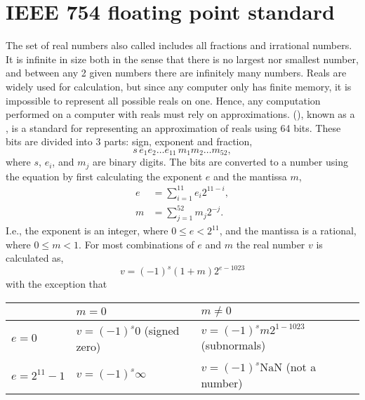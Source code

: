 \section{IEEE 754 floating point standard}
\label{sec:floatingPoint}
The set of real numbers also called  includes all fractions and irrational numbers. It is infinite in size both in the sense that there is no largest nor smallest number, and between any 2 given numbers there are infinitely many numbers. Reals are widely used for calculation, but since any computer only has finite memory, it is impossible to represent all possible reals on one. Hence, any computation performed on a computer with reals must rely on approximations.  (), known as a , is a standard for representing an approximation of reals using 64 bits. These bits are divided into 3 parts: sign, exponent and fraction, 
\begin{displaymath}
  s\, e_1 e_2 \ldots e_{11}\, m_1 m_2 \ldots m_{52},
\end{displaymath}
where $s$, $e_i$, and $m_j$ are binary digits. The bits are converted to a number using the equation by first calculating the exponent $e$ and the mantissa $m$,
\begin{align}
  e &= \sum _{i=1}^{11}e_i2^{11-i},\\
  m & = \sum _{j=1}^{52}m_j2^{-j}.
\end{align}
I.e., the exponent is an integer, where $0 \leq e < 2^{11}$, and the mantissa is a rational, where $0 \leq m < 1$. For most combinations of $e$ and $m$ the real number $v$ is calculated as,
\begin{equation}
  v = \left(-1\right)^{s} \left(1+m\right) 2^{e-1023}
\end{equation}
 with the exception that
\begin{center}
  \begin{tabular}{|l|l|l|}
    \hline
    \rowcolor{headerRowColor}& $m=0$                                   & $m\neq 0$\\
    \hline
    $e=0$           & $v = \left(-1\right)^{s} 0$ (signed zero) & $v = \left(-1\right)^{s} m 2^{1-1023}$ (subnormals)\\
    \hline 
    $e=2^{11}-1$ & $v = \left(-1\right)^{s} \infty$               & $v = \left(-1\right)^{s} \text{NaN}$ (not a number)\\
    \hline
  \end{tabular}
\end{center}
